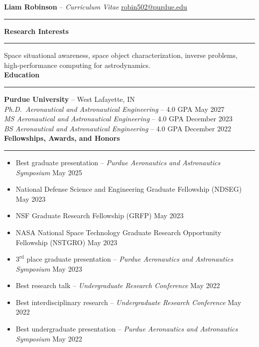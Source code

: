 \documentclass[10pt, a4paper]{article}
\newcommand{\sectiontitle}[1]{{\Large \textbf{#1}}\vspace{0.5em}\hrule\vspace{0.5em}}
\begin{document}
\thispagestyle{empty}



\noindent
\textbf{\huge Liam Robinson }{\huge -- }\textit{\huge Curriculum Vitae} \hfill \href{mailto:robin502@purdue.edu}{robin502@purdue.edu}
\rule{\linewidth}{4pt}
\vspace{-0.5em}

\sectiontitle{Research Interests}

Space situational awareness, space object characterization, inverse problems, high-performance computing for astrodynamics. \\

\sectiontitle{Education}
\textbf{Purdue University} -- West Lafayette, IN \\
\textit{Ph.D.\ Aeronautical and Astronautical Engineering} -- 4.0 GPA \hfill May 2027 \\
\textit{MS Aeronautical and Astronautical Engineering} -- 4.0 GPA \hfill December 2023 \\
\textit{BS Aeronautical and Astronautical Engineering} -- 4.0 GPA \hfill December 2022 \\

\sectiontitle{Fellowships, Awards, and Honors}
\begin{itemize}[noitemsep]
    \item Best graduate presentation -- \textit{Purdue Aeronautics and Astronautics Symposium} \hfill May 2025
    \item National Defense Science and Engineering Graduate Fellowship (NDSEG) \hfill May 2023
    \item NSF Graduate Research Fellowship (GRFP) \hfill May 2023
    \item NASA National Space Technology Graduate Research Opportunity Fellowship (NSTGRO) \hfill May 2023
    \item $3^\text{rd}$ place graduate presentation -- \textit{Purdue Aeronautics and Astronautics Symposium} \hfill May 2023
    \item Best research talk -- \textit{Undergraduate Research Conference} \hfill May 2022
    \item Best interdisciplinary research -- \textit{Undergraduate Research Conference} \hfill May 2022
    \item Best undergraduate presentation -- \textit{Purdue Aeronautics and Astronautics Symposium} \hfill May 2022
\end{itemize}
\end{document}
